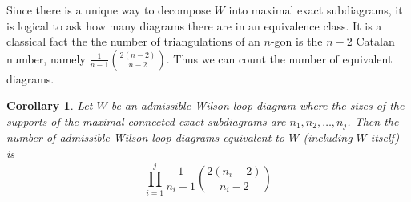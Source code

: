 \documentclass[11pt]{article}
\newtheorem{thm}{Theorem}[section]
\newtheorem{cor}[thm]{Corollary}
\theoremstyle{remark}
\theoremstyle{definition}
\newtheorem{dfn}[thm]{Definition}
\begin{document}
Since there is a unique way to decompose $W$ into maximal exact subdiagrams, it is logical to ask how many diagrams there are in an equivalence class. It is a classical fact the the number of triangulations of an $n$-gon is the $n-2$ Catalan number, namely $\frac{1}{n-1}\binom{2(n-2)}{n-2}$.  Thus we can count the number of equivalent diagrams.

\begin{cor}
  Let $W$ be an admissible Wilson loop diagram where the sizes of the supports of the maximal connected exact subdiagrams are $n_1, n_2, \ldots, n_j$.  Then the number of admissible Wilson loop diagrams equivalent to $W$ (including $W$ itself) is
  \[
  \prod_{i=1}^{j} \frac{1}{n_i-1}\binom{2(n_i-2)}{n_i-2}
  \]
\end{cor}

\end{document}
